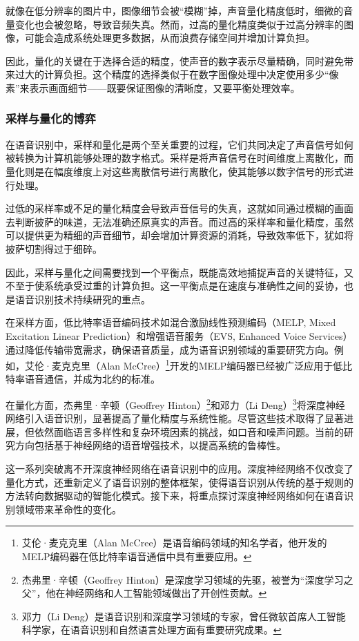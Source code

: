 就像在低分辨率的图片中，图像细节会被“模糊”掉，声音量化精度低时，细微的音量变化也会被忽略，导致音频失真。然而，过高的量化精度类似于过高分辨率的图像，可能会造成系统处理更多数据，从而浪费存储空间并增加计算负担。

因此，量化的关键在于选择合适的精度，使声音的数字表示尽量精确，同时避免带来过大的计算负担。这个精度的选择类似于在数字图像处理中决定使用多少“像素”来表示画面细节——既要保证图像的清晰度，又要平衡处理效率。

\subsubsection{采样与量化的博弈}

在语音识别中，采样和量化是两个至关重要的过程，它们共同决定了声音信号如何被转换为计算机能够处理的数字格式。采样是将声音信号在时间维度上离散化，而量化则是在幅度维度上对这些离散信号进行离散化，使其能够以数字信号的形式进行处理。

过低的采样率或不足的量化精度会导致声音信号的失真，这就如同通过模糊的画面去判断披萨的味道，无法准确还原真实的声音。而过高的采样率和量化精度，虽然可以提供更为精细的声音细节，却会增加计算资源的消耗，导致效率低下，犹如将披萨切割得过于细碎。

因此，采样与量化之间需要找到一个平衡点，既能高效地捕捉声音的关键特征，又不至于使系统承受过重的计算负担。这一平衡点是在速度与准确性之间的妥协，也是语音识别技术持续研究的重点。

在采样方面，低比特率语音编码技术如混合激励线性预测编码（MELP, Mixed Excitation Linear Prediction）和增强语音服务（EVS, Enhanced Voice Services）通过降低传输带宽需求，确保语音质量，成为语音识别领域的重要研究方向。例如，艾伦·麦克克里（Alan McCree）\footnote{艾伦·麦克克里（Alan McCree）是语音编码领域的知名学者，他开发的MELP编码器在低比特率语音通信中具有重要应用。}开发的MELP编码器已经被广泛应用于低比特率语音通信，并成为北约的标准。

在量化方面，杰弗里·辛顿（Geoffrey Hinton）\footnote{杰弗里·辛顿（Geoffrey Hinton）是深度学习领域的先驱，被誉为“深度学习之父”，他在神经网络和人工智能领域做出了开创性贡献。}和邓力（Li Deng）\footnote{邓力（Li Deng）是语音识别和深度学习领域的专家，曾任微软首席人工智能科学家，在语音识别和自然语言处理方面有重要研究成果。}将深度神经网络引入语音识别，显著提高了量化精度与系统性能。尽管这些技术取得了显著进展，但依然面临语言多样性和复杂环境因素的挑战，如口音和噪声问题。当前的研究方向包括基于神经网络的语音增强技术，以提高系统的鲁棒性。

这一系列突破离不开深度神经网络在语音识别中的应用。深度神经网络不仅改变了量化方式，还重新定义了语音识别的整体框架，使得语音识别从传统的基于规则的方法转向数据驱动的智能化模式。接下来，将重点探讨深度神经网络如何在语音识别领域带来革命性的变化。


